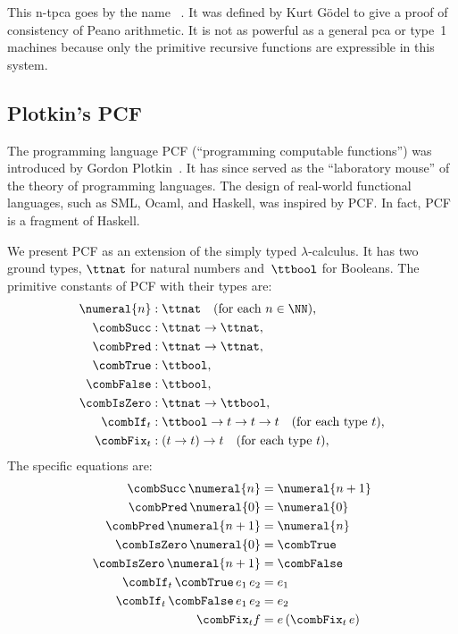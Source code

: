 This n-tpca goes by the name ~. It was defined by Kurt Gödel to give a
proof of consistency of Peano arithmetic. It is not as powerful as a
general pca or type~1 machines because only the primitive recursive
functions are expressible in this system.

\subsection{Plotkin's PCF}
\label{sec:pcf}

The programming language PCF (``programming computable functions'')  was introduced by Gordon Plotkin~. It has since
served as the ``laboratory mouse'' of the theory of programming
languages. The design of real-world functional languages, such as SML,
Ocaml, and Haskell, was inspired by PCF. In fact, PCF is a fragment of
Haskell.

We present PCF as an extension of the simply typed $\lambda$-calculus. It has two ground types, $\ttnat$ for natural numbers and~$\ttbool$ for Booleans. The primitive constants of PCF with their types are:
%
\begin{align*}
  \numeral{n} &: \ttnat \quad \text{(for each $n \in \NN$),} \\
  \combSucc &: \ttnat \to \ttnat, \\
  \combPred &: \ttnat \to \ttnat, \\
  \combTrue &: \ttbool, \\
  \combFalse &: \ttbool, \\
  \combIsZero &: \ttnat \to \ttbool, \\
  \combIf_t &: \ttbool \to t \to t \to t \quad\text{(for each type $t$),}\\
  \combFix_t &: (t \to t) \to t \quad\text{(for each type $t$),}
\end{align*}
%
The specific equations are:
%
\begin{align*}
  \combSucc \, \numeral{n} &= \numeral{n + 1}
  \\
  \combPred \, \numeral{0} &= \numeral{0}
  \\
  \combPred \, \numeral{n+1} &= \numeral{n}
  \\
  \combIsZero \, \numeral{0} &= \combTrue
  \\
  \combIsZero \, \numeral{n+1} &= \combFalse
  \\
  \combIf_t \, \combTrue \, e_1 \, e_2 &= e_1
  \\
  \combIf_t \, \combFalse \, e_1 \, e_2 &= e_2
  \\
  \combFix_t f &= e \, (\combFix_t \, e)
\end{align*}
%

